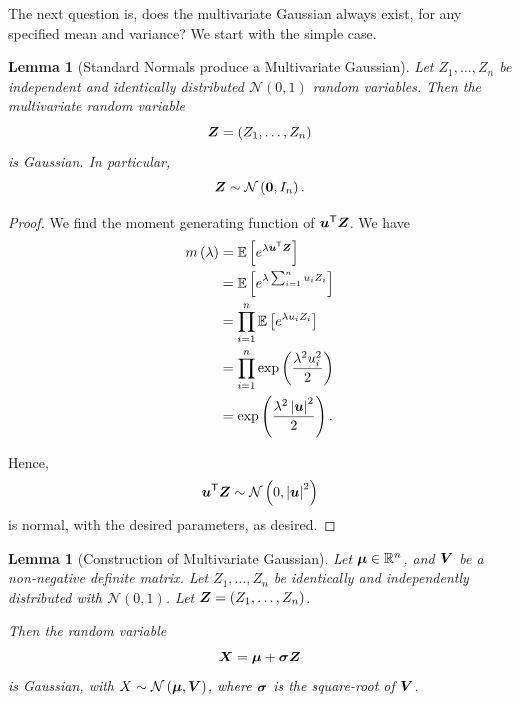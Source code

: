 \documentclass[11pt]{article}
\numberwithin{equation}{section}
\newtheorem{lemma}[theorem]{Lemma}
\theoremstyle{definition}
\theoremstyle{remark}
\newcommand{\pqty}[1]{\left(#1\right)}
\newcommand{\bqty}[1]{\left[#1\right]}
\newcommand{\abs}[1]{\left|#1\right|}
\newcommand{\RR}{\mathbb R}
\newcommand{\transpose}{^{\mathsf T}}
\newcommand{\Expt}{\mathbb E}
\newcommand{\identityM}{I}
\newcommand{\Normal}{\mathcal N}
\begin{document}
The next question is, does the multivariate Gaussian always exist, for any specified mean and variance? We start with the simple case. 

\begin{lemma}[Standard Normals produce a Multivariate Gaussian]\label{probability-lemma-010}
    \label{probability-lem:standard-normal-multivariate-gaussian}%
    Let \(Z_1, \ldots, Z_n\) be independent and identically distributed \(\Normal\pqty{0, 1}\) random variables. Then the multivariate random variable
    \[
        \vb{Z} = \pqty{Z_1, \ldots, Z_n}
    \]
    is Gaussian. In particular,
    \[
        \vb{Z} \sim \Normal\pqty{\vb{0}, \identityM_n}.
    \]
\end{lemma}

\begin{proof}\label{probability-proof-082}
    We find the moment generating function of \(\vb{u} \transpose \vb{Z}\). We have
    \begin{align*}
        m\pqty{\lambda} &= \Expt\bqty{e^{\lambda \vb{u}\transpose \vb{Z}}} \\
        &= \Expt\bqty{e^{\lambda \sum_{i = 1}^{n} u_i Z_i}} \\
        &= \prod_{i = 1}^{n} \Expt\bqty{e^{\lambda u_i Z_i}} \\
        &= \prod_{i = 1}^{n} \exp\pqty{\frac{\lambda^2 u_i^2}{2}} \\
        &= \exp\pqty{\frac{\lambda^2 \abs{\vb{u}}^2}{2}}.
    \end{align*}

    Hence,
    \[
        \vb{u}\transpose \vb{Z} \sim \Normal \pqty{0, \abs{\vb{u}}^2}
    \]
    is normal, with the desired parameters, as desired.
\end{proof}

\begin{lemma}[Construction of Multivariate Gaussian]\label{probability-lemma-011}
    \label{probability-lem:construction-multivariate-gaussian}%
    Let \(\vb*{\mu} \in \RR^n\), and \(\vb{V}\) be a non-negative definite matrix. Let \(Z_1, \ldots, Z_n\) be identically and independently distributed with \(\Normal\pqty{0, 1}\). Let \(\vb{Z} = \pqty{Z_1, \ldots, Z_n}\).

    Then the random variable
    \[
        \vb{X} = \vb*{\mu} + \vb*{\sigma} \vb{Z}
    \]
    is Gaussian, with \(X \sim \Normal\pqty{\vb*{\mu}, \vb{V}}\), where \(\vb*{\sigma}\) is the square-root of \(\vb{V}\).
\end{lemma}
\end{document}

